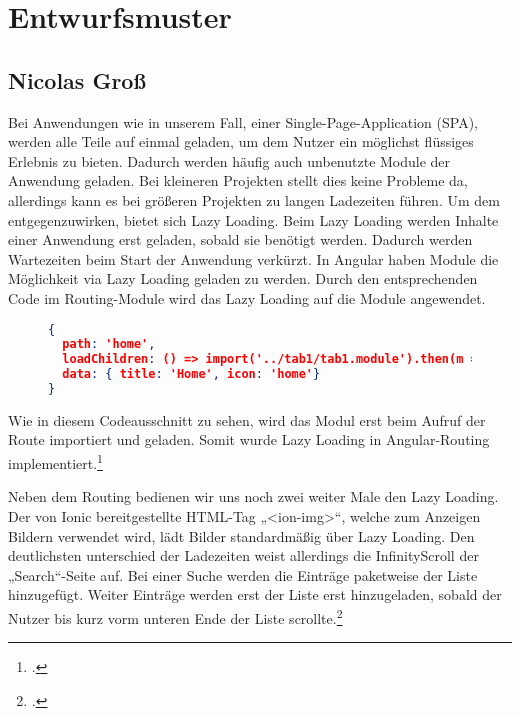
\section{Entwurfsmuster}

\subsection*{Nicolas Groß}

Bei Anwendungen wie in unserem Fall, einer Single-Page-Application (SPA), werden alle Teile auf einmal geladen, um dem Nutzer ein möglichst flüssiges Erlebnis zu bieten. Dadurch werden häufig auch unbenutzte Module der Anwendung geladen. Bei kleineren Projekten stellt dies keine Probleme da, allerdings kann es bei größeren Projekten zu langen Ladezeiten führen. Um dem entgegenzuwirken, bietet sich Lazy Loading. Beim Lazy Loading werden Inhalte einer Anwendung erst geladen, sobald sie benötigt werden. Dadurch werden Wartezeiten beim Start der Anwendung verkürzt.
In Angular haben Module die Möglichkeit via Lazy Loading geladen zu werden. Durch den entsprechenden Code im Routing-Module wird das Lazy Loading auf die Module angewendet.

\begin{figure}[bht]
\begin{lstlisting}[caption=Codeausschnitt des Tabs Routingmodule,language=json]
{
  path: 'home',
  loadChildren: () => import('../tab1/tab1.module').then(m => Tab1PageModule),
  data: { title: 'Home', icon: 'home'}
}
\end{lstlisting}
\end{figure}

Wie in diesem Codeausschnitt zu sehen, wird das Modul erst beim Aufruf der Route importiert und geladen. Somit wurde Lazy Loading in Angular-Routing implementiert.\footcites[.vgl]{LazyLoading2021}

Neben dem Routing bedienen wir uns noch zwei weiter Male den Lazy Loading. Der von Ionic bereitgestellte HTML-Tag „<ion-img>“, welche zum Anzeigen Bildern verwendet wird, lädt Bilder standardmäßig über Lazy Loading. Den deutlichsten unterschied der Ladezeiten weist allerdings die InfinityScroll der „Search“-Seite auf. Bei einer Suche werden die Einträge paketweise der Liste hinzugefügt. Weiter Einträge werden erst der Liste erst hinzugeladen, sobald der Nutzer bis kurz vorm unteren Ende der Liste scrollte.\footcites[.vgl]{Ionic2013b}